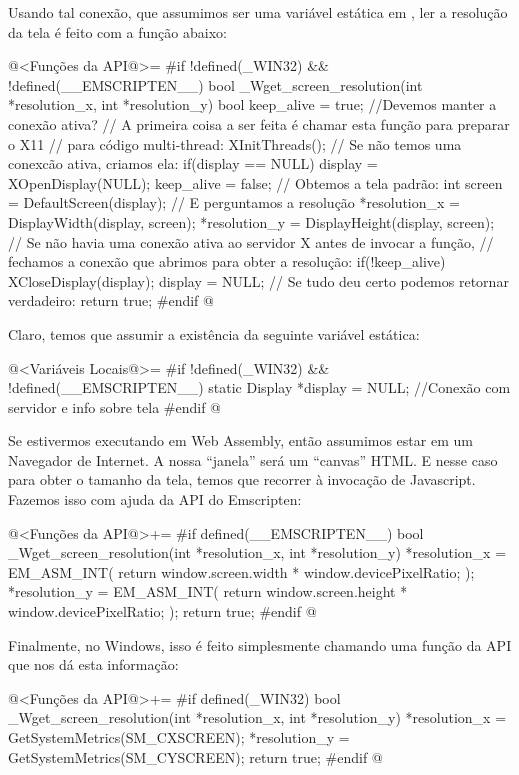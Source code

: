 Usando tal conexão, que assumimos ser uma variável estática
em , ler a resolução da tela é feito com a função
abaixo:

\iniciocodigo
@<Funções da API@>=
#if !defined(_WIN32) && !defined(__EMSCRIPTEN__)
bool _Wget_screen_resolution(int *resolution_x, int *resolution_y){
  bool keep_alive = true; //Devemos manter a conexão ativa?
  // A primeira coisa a ser feita é chamar esta função para preparar o X11
  // para código multi-thread:
  XInitThreads();
  // Se não temos uma conexcão ativa, criamos ela:
  if(display == NULL){
    display = XOpenDisplay(NULL);
    keep_alive = false;
  }
  // Obtemos a tela padrão:
  int screen = DefaultScreen(display);
  // E perguntamos a resolução
  *resolution_x = DisplayWidth(display, screen);
  *resolution_y = DisplayHeight(display, screen);
  // Se não havia uma conexão ativa ao servidor X antes de invocar a função,
  // fechamos a conexão que abrimos para obter a resolução:
  if(!keep_alive){
    XCloseDisplay(display);
    display = NULL;
  }
  // Se tudo deu certo podemos retornar verdadeiro:
  return true;
}
#endif
@
\fimcodigo

Claro, temos que assumir a existência da seguinte variável estática:

\iniciocodigo
@<Variáveis Locais@>=
#if !defined(_WIN32) && !defined(__EMSCRIPTEN__)
static Display *display = NULL; //Conexão com servidor e info sobre tela
#endif
@
\fimcodigo


Se estivermos executando em Web Assembly, então assumimos estar em um
Navegador de Internet. A nossa ``janela'' será um ``canvas'' HTML. E
nesse caso para obter o tamanho da tela, temos que recorrer à
invocação de Javascript. Fazemos isso com ajuda da API do Emscripten:

\iniciocodigo
@<Funções da API@>+=
#if defined(__EMSCRIPTEN__)
bool _Wget_screen_resolution(int *resolution_x, int *resolution_y){
  *resolution_x = EM_ASM_INT({
    return window.screen.width * window.devicePixelRatio;
  });
  *resolution_y = EM_ASM_INT({
    return window.screen.height * window.devicePixelRatio;
  });
  return true;
}
#endif
@
\fimcodigo



Finalmente, no Windows, isso é feito simplesmente chamando uma função
da API que nos dá esta informação:

\iniciocodigo
@<Funções da API@>+=
#if defined(_WIN32)
bool _Wget_screen_resolution(int *resolution_x, int *resolution_y){
  *resolution_x = GetSystemMetrics(SM_CXSCREEN);
  *resolution_y = GetSystemMetrics(SM_CYSCREEN);
  return true;
}
#endif
@
\fimcodigo

